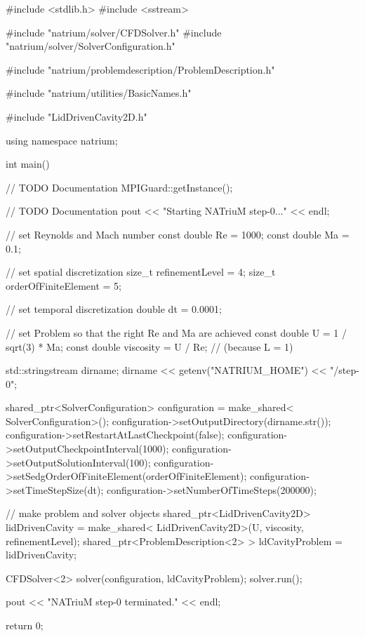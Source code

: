 \begin{DoxyCodeInclude}


#include <stdlib.h>
#include <sstream>

#include "natrium/solver/CFDSolver.h"
#include "natrium/solver/SolverConfiguration.h"

#include "natrium/problemdescription/ProblemDescription.h"

#include "natrium/utilities/BasicNames.h"

#include "LidDrivenCavity2D.h"

using namespace natrium;



int main() {
        // TODO Documentation
        MPIGuard::getInstance();

        // TODO Documentation
        pout << "Starting NATriuM step-0..." << endl;

        // set Reynolds and Mach number
        const double Re = 1000;
        const double Ma = 0.1;

        // set spatial discretization
        size_t refinementLevel = 4;
        size_t orderOfFiniteElement = 5;

        // set temporal discretization
        double dt = 0.0001;

        // set Problem so that the right Re and Ma are achieved
        const double U = 1 / sqrt(3) * Ma;
        const double viscosity = U / Re; // (because L = 1)

        std::stringstream dirname;
        dirname << getenv("NATRIUM_HOME") << "/step-0";

        shared_ptr<SolverConfiguration> configuration = make_shared<
                        SolverConfiguration>();
        configuration->setOutputDirectory(dirname.str());
        configuration->setRestartAtLastCheckpoint(false);
        configuration->setOutputCheckpointInterval(1000);
        configuration->setOutputSolutionInterval(100);
        configuration->setSedgOrderOfFiniteElement(orderOfFiniteElement);
        configuration->setTimeStepSize(dt);
        configuration->setNumberOfTimeSteps(200000);

        // make problem and solver objects
        shared_ptr<LidDrivenCavity2D> lidDrivenCavity = make_shared<
                        LidDrivenCavity2D>(U, viscosity, refinementLevel);
        shared_ptr<ProblemDescription<2> > ldCavityProblem = lidDrivenCavity;

        CFDSolver<2> solver(configuration, ldCavityProblem);
        solver.run();

        pout << "NATriuM step-0 terminated." << endl;

        return 0;
}

\end{DoxyCodeInclude}
 